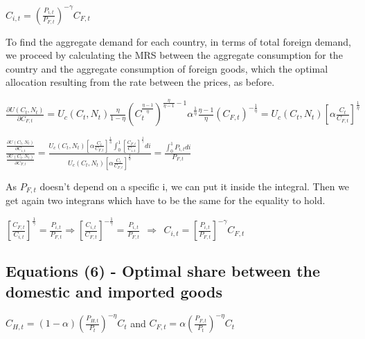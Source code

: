 \documentclass[
]{article}
\begin{document}
\(\displaystyle C_{i,t}= \left( \frac{P_{i,t}}{P_{F,t}}\right)^{-\gamma}C_{F,t}\)

\vspace{8pt}

To find the aggregate demand for each country, in terms of total foreign
demand, we proceed by calculating the MRS between the aggregate
consumption for the country and the aggregate consumption of foreign
goods, which the optimal allocation resulting from the rate between the
prices, as before.

\(\displaystyle \frac{\partial U(C_t,N_t)}{\partial C_{F,t}} = U_c(C_t,N_t)\frac{\eta}{1-\eta}\left( C_t^{\frac{\eta-1}{\eta}} \right)^{\frac{\eta}{\eta-1}-1} \alpha^{\frac{1}{\eta}}\frac{\eta-1}{\eta}\left( C_{F,t}\right)^{-\frac{1}{\eta}} = U_c(C_t,N_t) \left[ \alpha \frac{C_t}{C_{F,t}} \right]^{\frac{1}{\eta}}\)

\(\displaystyle \frac{\displaystyle \frac{\partial U(C_t,N_t)}{\displaystyle \partial C_{i,t}}}{\frac{\displaystyle \partial U(C_t,N_t)}{\displaystyle \partial C_{F,t}}} = \frac{\displaystyle U_c(C_t,N_t) \left[ \alpha \frac{C_t}{C_{F,t}} \right]^{\frac{1}{\eta}} \int_0^1 \left[\frac{C_{F,t}}{C_{i,t}}\right]^{\frac{1}{\gamma}} di }{\displaystyle U_c(C_t,N_t) \left[ \alpha \frac{C_t}{C_{F,t}} \right]^{\frac{1}{\eta}} } = \frac{\displaystyle \int_0^1P_{i,t}di}{P_{F,t}}\)

As \(P_{F,t}\) doesn't depend on a specific i, we can put it inside the
integral. Then we get again two integrans which have to be the same for
the equality to hold.

\(\displaystyle \left[\frac{C_{F,t}}{C_{i,t}}\right]^{\frac{1}{\gamma}} = \frac{P_{i,t}}{P_{F,t}} \Rightarrow \left[\frac{C_{i,t}}{C_{F,t}}\right]^{-\frac{1}{\gamma}} = \frac{P_{i,t}}{P_{F,t}} \ \ \Rightarrow \ \ C_{i,t} = \left[ \frac{P_{i,t}}{P_{F,t}} \right]^{-\gamma}C_{F,t}\)

\vspace{12pt}

\hypertarget{equations-6---optimal-share-between-the-domestic-and-imported-goods}{%
\subsection{Equations (6) - Optimal share between the domestic and
imported
goods}\label{equations-6---optimal-share-between-the-domestic-and-imported-goods}}

\(\displaystyle C_{H,t} = (1-\alpha)\left( \frac{P_{H,t}}{P_t} \right)^{-\eta}C_t\)
and
\(\displaystyle C_{F,t} = \alpha \left( \frac{P_{F,t}}{P_t} \right)^{-\eta}C_t\)
\end{document}
